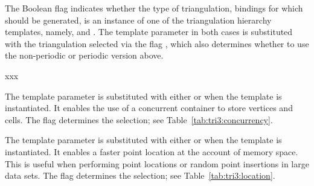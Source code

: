 The \cmake{} Boolean flag  indicates
whether the type of triangulation, bindings for which should be
generated, is an instance of one of the triangulation hierarchy
templates, namely,
 and
.
The template parameter in both cases is substituted with the
triangulation selected via the \cmake{} flag
, which also determines whether to use the
non-periodic or periodic version above.

xxx

The template parameter  is substituted
with either  or
 when the template
 is instantiated. It enables the use of a concurrent
container to store vertices and cells. The \cmake{} flag
 determines the selection; see
Table~\ref{tab:tri3:concurrency}.

\begin{table}[!htp]
  \caption{3D triangulation concurrency options}
  \centering{}
  \label{tab:tri3:concurrency}
\end{table}
%

The template parameter  is substituted
with either  or
 when the template
is instantiated. It enables a faster point location at the account of
memory space. This is useful when performing point locations or random
point insertions in large data sets.  The \cmake{} flag
 determines the
selection; see Table~\ref{tab:tri3:location}.

\begin{table}[!htp]
  \caption{3D triangulation location policy options}
  \centering{}
  \label{tab:tri3:location}
\end{table}

